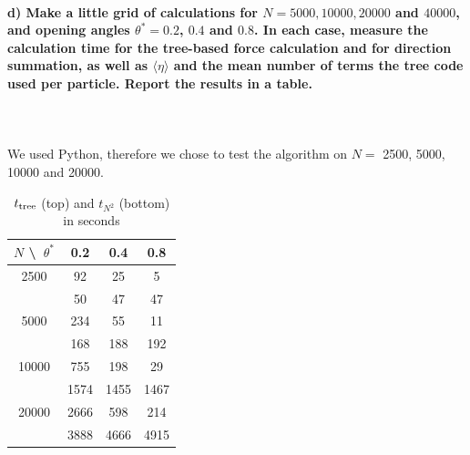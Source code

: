 \newpage
\paragraph{d) Make a little grid of calculations for 
    $N=5000, 10000, 20000$ and $40000$, and opening angles 
    $\theta^*=0.2$, $0.4$ and $0.8$. In each case, measure the 
    calculation time for the tree-based force calculation and 
    for direction summation, as well as $\langle\eta\rangle$ 
    and the mean number of terms the tree code used per particle. 
    Report the results in a table.
} \ \\
    \\
    We used Python, therefore we chose to test the algorithm on 
    $N=$ 2500, 5000, 10000 and 20000.
    \begin{table}[h!]
        \begin{center}
        \caption{$t_\textnormal{tree}$ (top) and $t_{N^2}$ (bottom) in seconds}
        \begin{tabular}{c | c | c | c}
            $N$ \textbackslash\ $\theta^*$ & 0.2  & 0.4  & 0.8 \\
            \hline
            2500  & 92   & 25   & 5    \\
                  & 50   & 47   & 47   \\
            \hline
            5000  & 234  & 55   & 11   \\
                  & 168  & 188  & 192  \\
            \hline
            10000 & 755  & 198  & 29   \\
                  & 1574 & 1455 & 1467 \\
            \hline
            20000 & 2666 & 598  & 214  \\
                  & 3888 & 4666 & 4915 \\
        \end{tabular}
        \end{center}
    \end{table} 
